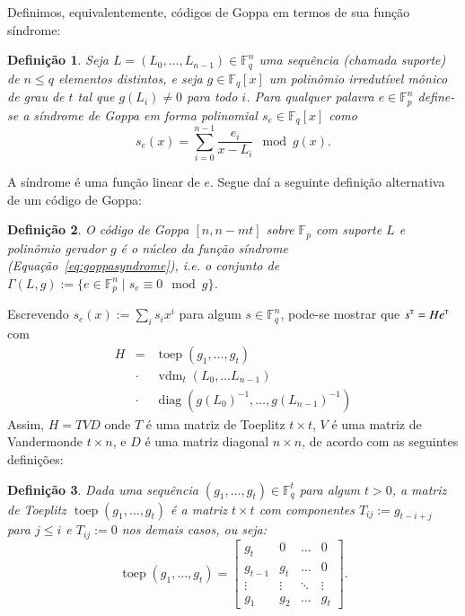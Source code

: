 \documentclass{SBCbookchapter}
\newcommand{\F}{\mathbb{F}}
\newcommand{\tp}{\textrm{\tiny T}}
\DeclareMathOperator{\toep}{toep}
\DeclareMathOperator{\vdm}{vdm}
\DeclareMathOperator{\diag}{diag}
\newtheorem{definition}{Definição}{\bfseries}{\itshape}
\begin{document}
\begin{otherlanguage}{brazilian}
Definimos, equivalentemente, códigos de Goppa em termos de sua função síndrome:
\begin{definition}\label{def:goppa-syndrome}
Seja $L = (L_0, \dots, L_{n-1}) \in \F_q^n$ uma sequência (chamada \emph{suporte}) de $n \leqslant q$ elementos distintos, e seja $g \in \F_q[x]$ um polinômio irredutível mônico de grau de $t$ tal que $g(L_i) \neq 0$ para todo $i$. Para qualquer palavra $e \in \F_p^n$ define-se a \emph{síndrome de Goppa} em forma polinomial $s_e \in \F_q[x]$ como
\begin{equation}\label{eq:goppasyndrome}
s_e(x) = \sum_{i=0}^{n-1}{\dfrac{e_i}{x - L_i} \mod{g(x)}}.
\end{equation}
\end{definition}
A síndrome é uma função linear de $e$. Segue daí a seguinte definição alternativa de um código de Goppa:
\begin{definition}
O \emph{código de Goppa} $[n, n - mt]$ sobre $\F_p$ com suporte $L$ e polinômio gerador $g$ é o núcleo da função síndrome (Equação~\ref{eq:goppasyndrome}), i.e. o conjunto de $\Gamma (L, g) := \{e \in \F_p^n \mid s_e \equiv 0 \mod{g}\}$.
\end{definition}

Escrevendo $s_e(x) := \sum_i{s_i x^i}$ para algum $s \in \F_q^n$, pode-se mostrar que $s^{\tp} = H e^{\tp}$ com
\begin{equation}\label{eq:parity-check}
\begin{array}{rcl}
H &=& \toep(g_1, \dots, g_t)\\
  &\cdot& \vdm_t(L_0, \dots L_{n-1})\\
  &\cdot& \diag(g(L_0)^{-1}, \dots, g(L_{n-1})^{-1})
\end {array}
\end{equation}
Assim, $H = TVD$ onde $T$ é uma matriz de Toeplitz $t \times t$, $V$ é uma matriz de Vandermonde $t \times n$, e $D$ é uma matriz diagonal $n \times n$, de acordo com as seguintes definições:

\begin{definition}
Dada uma sequência $(g_1, \dots, g_t) \in \F_q^t$ para algum $t > 0$, a \emph{matriz de Toeplitz} $\toep(g_1, \dots, g_t)$ é a matriz $t \times t$ com componentes $T_{ij} := g_{t - i + j}$ para $j \leqslant i$ e $T_{ij} := 0$ nos demais casos, ou seja:
\[
\toep(g_1, \dots, g_t) = \left[
\begin{array}{cccc}
g_t     & 0      & \dots  & 0\\
g_{t-1} & g_t    & \dots  & 0\\
\vdots  & \vdots & \ddots & \vdots\\
g_1     & g_2    & \dots  & g_t
\end{array}
\right].
\]
\end{definition}


\end{otherlanguage}
\end{document}
